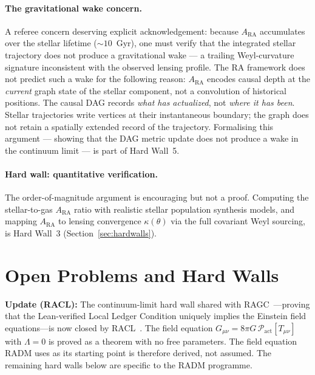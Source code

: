 \documentclass[11pt,a4paper]{article}
\theoremstyle{plain}
\theoremstyle{definition}
\theoremstyle{remark}
\newcommand{\ARA}{A_{\mathrm{RA}}}
\begin{document}
\paragraph{The gravitational wake concern.}
A referee concern deserving explicit acknowledgement: because $A_{\mathrm{RA}}$
accumulates over the stellar lifetime ($\sim 10$~Gyr), one must verify that
the integrated stellar trajectory does not produce a gravitational wake --- a
trailing Weyl-curvature signature inconsistent with the observed lensing
profile. The RA framework does not predict such a wake for the following
reason: $A_{\mathrm{RA}}$ encodes causal depth at the \emph{current} graph
state of the stellar component, not a convolution of historical positions.
The causal DAG records \emph{what has actualized}, not \emph{where it has
been}. Stellar trajectories write vertices at their instantaneous boundary;
the graph does not retain a spatially extended record of the trajectory.
Formalising this argument --- showing that the DAG metric update does not
produce a wake in the continuum limit --- is part of Hard Wall~5.

\paragraph{Hard wall: quantitative verification.}
The order-of-magnitude argument is encouraging but not a proof. Computing the
stellar-to-gas $\ARA$ ratio with realistic stellar population synthesis models,
and mapping $\ARA$ to lensing convergence $\kappa(\theta)$ via the full covariant
Weyl sourcing, is Hard Wall~3 (Section~\ref{sec:hardwalls}).

\section{Open Problems and Hard Walls}

\textbf{Update (RACL):} The continuum-limit hard wall shared with
RAGC~\citep{Sandeman2026b}---proving that the Lean-verified Local
Ledger Condition uniquely implies the Einstein field equations---is now
closed by RACL~\citep{Sandeman2026RACL}. The field equation
$G_{\mu\nu} = 8\pi G\,\mathcal{P}_{\mathrm{act}}[T_{\mu\nu}]$ with
$\Lambda = 0$ is proved as a theorem with no free parameters.
The field equation RADM uses as its starting point is therefore derived,
not assumed. The remaining hard walls below are specific to the
RADM programme.

\label{sec:hardwalls}
\end{document}
